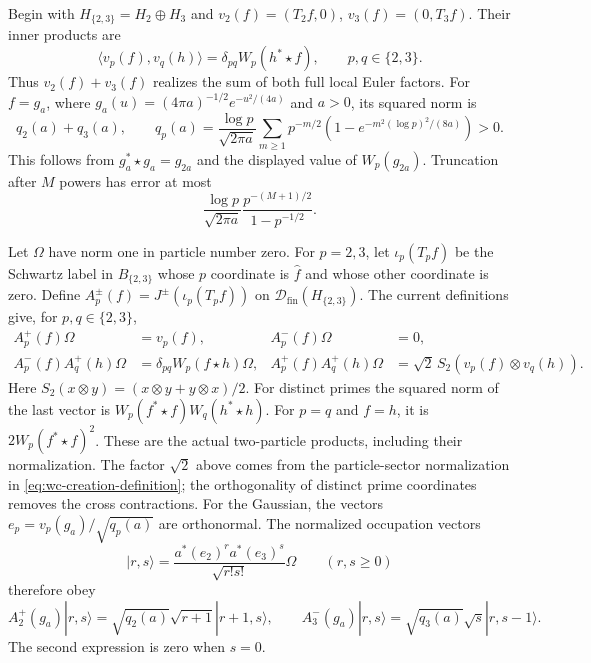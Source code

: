 \documentclass[11pt]{article}
\theoremstyle{definition}
\theoremstyle{remark}
\numberwithin{equation}{section}
\begin{document}
Begin with $H_{\{2,3\}}=H_2\oplus H_3$ and
$v_2(f)=(T_2f,0)$, $v_3(f)=(0,T_3f)$.
Their inner products are
\begin{equation}
 \langle v_p(f),v_q(h)\rangle
 =\delta_{pq}W_p(h^*\star f),\qquad p,q\in\{2,3\}.
 \label{eq:wc-two-prime-covariance}
\end{equation}
Thus $v_2(f)+v_3(f)$ realizes the sum of both full local Euler factors.
For $f=g_a$, where
$g_a(u)=(4\pi a)^{-1/2}e^{-u^2/(4a)}$ and $a>0$, its squared norm is
\begin{equation}
 q_2(a)+q_3(a),\qquad
 q_p(a)=\frac{\log p}{\sqrt{2\pi a}}
 \sum_{m\geq1}p^{-m/2}
 \left(1-e^{-m^2(\log p)^2/(8a)}\right)>0.
 \label{eq:wc-gaussian-norm}
\end{equation}
This follows from $g_a^*\star g_a=g_{2a}$ and the displayed value of
$W_p(g_{2a})$.  Truncation after $M$ powers has error at most
\[
 \frac{\log p}{\sqrt{2\pi a}}
 \frac{p^{-(M+1)/2}}{1-p^{-1/2}}.
\]

Let $\Omega$ have norm one in particle number zero.
For $p=2,3$, let $\iota_p(T_pf)$ be the Schwartz label in $B_{\{2,3\}}$
whose $p$ coordinate is $\widehat f$ and whose other coordinate is zero.
Define $A_p^\pm(f)=J^\pm(\iota_p(T_pf))$ on
$\mathcal D_{\mathrm{fin}}(H_{\{2,3\}})$.
The current definitions give, for $p,q\in\{2,3\}$,
\begin{equation}
 \begin{aligned}
 A_p^+(f)\Omega&=v_p(f),& A_p^-(f)\Omega&=0,\\
 A_p^-(f)A_q^+(h)\Omega
 &=\delta_{pq}W_p(f\star h)\Omega,&
 A_p^+(f)A_q^+(h)\Omega
 &=\sqrt2\,S_2(v_p(f)\otimes v_q(h)).
 \end{aligned}
 \label{eq:wc-two-prime-action}
\end{equation}
Here $S_2(x\otimes y)=(x\otimes y+y\otimes x)/2$.
For distinct primes the squared norm of the last vector is
$W_p(f^*\star f)W_q(h^*\star h)$.
For $p=q$ and $f=h$, it is $2W_p(f^*\star f)^2$.
These are the actual two-particle products, including their normalization.
The factor $\sqrt2$ above comes from the particle-sector normalization
in \eqref{eq:wc-creation-definition}; the orthogonality of distinct prime
coordinates removes the cross contractions.
For the Gaussian, the vectors
$e_p=v_p(g_a)/\sqrt{q_p(a)}$ are orthonormal.
The normalized occupation vectors
\[
 |r,s\rangle=
 \frac{a^*(e_2)^r a^*(e_3)^s}{\sqrt{r!s!}}\Omega
 \qquad(r,s\geq0)
\]
therefore obey
\[
 A_2^+(g_a)|r,s\rangle
 =\sqrt{q_2(a)}\sqrt{r+1}|r+1,s\rangle,\qquad
 A_3^-(g_a)|r,s\rangle
 =\sqrt{q_3(a)}\sqrt{s}|r,s-1\rangle.
\]
The second expression is zero when $s=0$.
\end{document}
